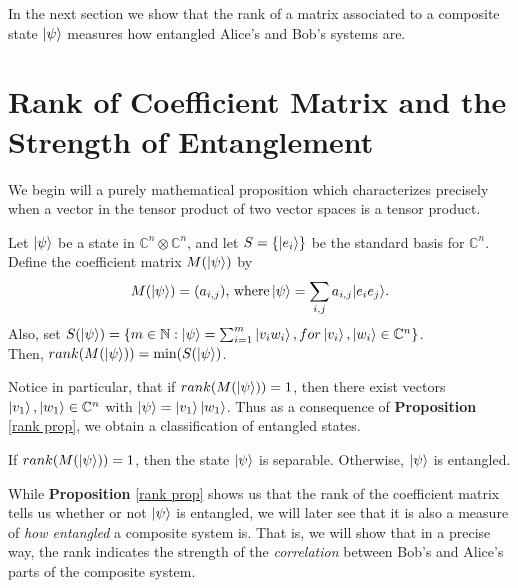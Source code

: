In the next section we show that the rank of a matrix associated to a composite state $\ket{\psi}$ measures how entangled Alice's and Bob's systems are.

\pagebreak

\section{Rank of Coefficient Matrix and the Strength of Entanglement}

We begin will a purely mathematical proposition which characterizes precisely when a vector in the tensor product of two vector spaces is a tensor product.

\begin{prop}
\label{rank prop}
Let $\ket{\psi}$ be a state in $\mathbb{C}^n \otimes \mathbb{C}^n$, and let $S=\{\ket{e_i}\}$ be the standard basis for $\mathbb{C}^n$. Define the coefficient matrix $M(\ket{\psi})$ by
\begin{equation}
M(\ket{\psi})=(a_{i,j}) \textrm{, where}\ket{\psi}=\sum\limits_{i,j}a_{i,j}|e_i e_j\rangle . 
\end{equation}
Also, set $S(\ket{\psi})=\{m\in \mathbb{N}: \ket{\psi}=\sum_{i=1}^m\ket{v_i w_i}, for \ket{v_i}, \ket{w_i} \in \mathbb{C}^n\}$.\\  Then, $rank(M(\ket{\psi}))=\textrm{min} (S(\ket{\psi})$.
\end{prop}

Notice in particular, that if $rank(M(\ket{\psi}))=1$, then there exist vectors $\ket{v_1}, \ket{w_1} \in \mathbb{C}^n$ with $\ket{\psi}=\ket{v_1}\ket{w_1}$.  Thus as a consequence of {\bf{Proposition}} \ref{rank prop}, we obtain a classification of entangled states.
\begin{corollary}
If $rank(M(\ket{\psi}))=1$, then the state $\ket{\psi}$ is separable. Otherwise, $\ket{\psi}$ is entangled.
\end{corollary}

While {\bf{Proposition}} \ref{rank prop} shows us that the rank of the coefficient matrix tells us whether or not $\ket{\psi}$ is entangled, we will later see that it is also a measure of {\emph{how entangled}} a composite system is. That is, we will show that in a precise way, the rank indicates the strength of the {\emph{correlation}} between Bob's and Alice's parts of the composite system.

